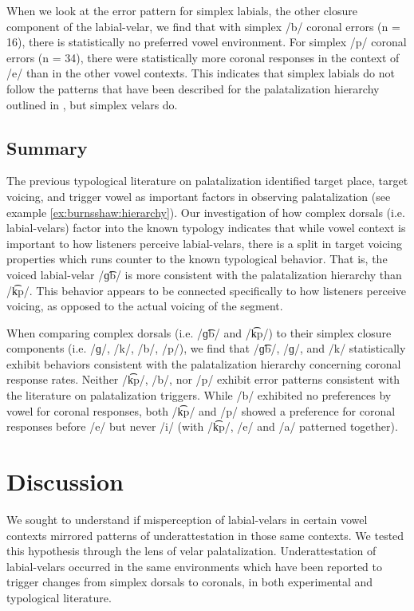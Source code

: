 \documentclass[output=paper,colorlinks,citecolor=brown
]{langscibook}
\begin{document}
When we look at the error pattern for simplex labials, the other closure component of the labial-velar, we find that with simplex /b/ coronal errors (n = 16), there is statistically no preferred vowel environment. For simplex /p/ coronal errors (n = 34), there were statistically more coronal responses in the context of /e/ than in the other vowel contexts. This indicates that simplex labials do not follow the patterns that have been described for the palatalization hierarchy outlined in , but simplex velars do.

\subsection{Summary}\label{sec:burnsshaw:Summary}
The previous typological literature on palatalization identified target place, target voicing, and trigger vowel as important factors in observing palatalization (see example \ref{ex:burnsshaw:hierarchy}). Our investigation of how complex dorsals (i.e. labial-velars) factor into the known typology indicates that while vowel context is important to how listeners perceive labial-velars, there is a split in target voicing properties which runs counter to the known typological behavior. That is, the voiced labial-velar /ɡ͡b/ is more consistent with the palatalization hierarchy than /k͡p/. This behavior appears to be connected specifically to how listeners perceive voicing, as opposed to the actual voicing of the segment.

When comparing complex dorsals (i.e. /ɡ͡b/ and /k͡p/) to their simplex closure components (i.e. /ɡ/, /k/, /b/, /p/), we find that /ɡ͡b/, /ɡ/, and /k/ statistically exhibit behaviors consistent with the palatalization hierarchy concerning coronal response rates. Neither /k͡p/, /b/, nor /p/ exhibit error patterns consistent with the literature on palatalization triggers. While /b/ exhibited no preferences by vowel for coronal responses, both /k͡p/ and /p/ showed a preference for coronal responses before /e/ but never /i/ (with /k͡p/, /e/ and /a/ patterned together).

\section{Discussion}\label{sec:burnsshaw:Discussion}
We sought to understand if misperception of labial-velars in certain vowel contexts mirrored patterns of underattestation in those same contexts. We tested this hypothesis through the lens of velar palatalization. Underattestation of labial-velars occurred in the same environments which have been reported to trigger changes from simplex dorsals to coronals, in both experimental and typological literature. 
\end{document}
